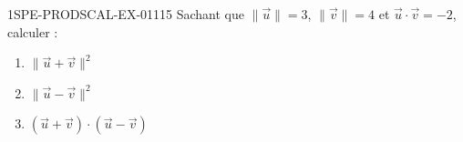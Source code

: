 \begin{exercice}{1SPE-PRODSCAL-EX-011}{1}{5}
Sachant que $\|\vec{u}\| = 3$, $\|\vec{v}\| = 4$ et $\vec{u} \cdot \vec{v} = -2$, calculer :
\begin{enumerate}
  \item $\|\vec{u} + \vec{v}\|^2$
  \item $\|\vec{u} - \vec{v}\|^2$
  \item $(\vec{u} + \vec{v}) \cdot (\vec{u} - \vec{v})$
\end{enumerate}
\end{exercice}
